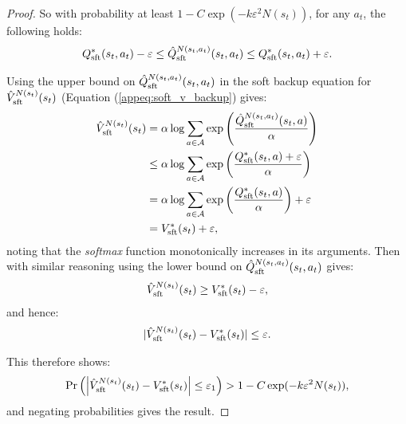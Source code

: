 \documentclass{article}
\newcommand{\cl}[1]{\mathcal{#1}}
\newcommand{\Vst}[2]{\hat{V}^{#2}_{\textnormal{sft}}(#1)}
\newcommand{\Vss}[1]{V^*_{\textnormal{sft}}(#1)}
\newcommand{\Qst}[3]{\hat{Q}^{#3}_{\textnormal{sft}}(#1,#2)}
\newcommand{\Qss}[2]{Q^*_{\textnormal{sft}}(#1,#2)}
\theoremstyle{plain}
\begin{document}
\begin{appendices}
\begin{proof}
            So with probability at least $1-C \exp(-k \varepsilon^2 N(s_t))$, for any $a_t$, the following holds:
            \begin{align}
                \Qss{s_t}{a_t} - \varepsilon \leq \Qst{s_t}{a_t}{N(s_t,a_t)} \leq \Qss{s_t}{a_t} + \varepsilon. 
            \end{align}
            
            Using the upper bound on $\Qst{s_t}{a_t}{N(s_t,a_t)}$ in the soft backup equation for $\Vst{s_t}{N(s_t)}$ (Equation (\ref{appeq:soft_v_backup}) gives:
            \begin{align}
                \Vst{s_t}{N(s_t)} &= \alpha \log \sum_{a\in\cl{A}} \exp\left(\frac{\Qst{s_t}{a}{N(s_t,a_t)}}{\alpha}\right) \\
                    &\leq \alpha \log \sum_{a\in\cl{A}} \exp\left(\frac{\Qss{s_t}{a}+\varepsilon}{\alpha}\right) \\
                    &= \alpha \log \sum_{a\in\cl{A}} \exp\left(\frac{\Qss{s_t}{a}}{\alpha}\right) + \varepsilon \\
                    &= \Vss{s_t} + \varepsilon,
            \end{align}
            noting that the \textit{softmax} function monotonically increases in its arguments. Then with similar reasoning using the lower bound on $\Qst{s_t}{a_t}{N(s_t,a_t)}$ gives:
            \begin{align}
                \Vst{s_t}{N(s_t)} \geq \Vss{s_t} - \varepsilon,
            \end{align}
            and hence:
            \begin{align}
                |\Vst{s_t}{N(s_t)}-\Vss{s_t}| \leq \varepsilon.
            \end{align}
            
            This therefore shows:
            \begin{align}
                \Pr\left(\left|\Vst{s_t}{N(s_t)}-\Vss{s_t}\right| \leq \varepsilon_1\right) > 1-C \exp(-k \varepsilon^2 N(s_t)),
            \end{align}
            and negating probabilities gives the result.
        \end{proof}






        
    

\end{appendices}
\end{document}
